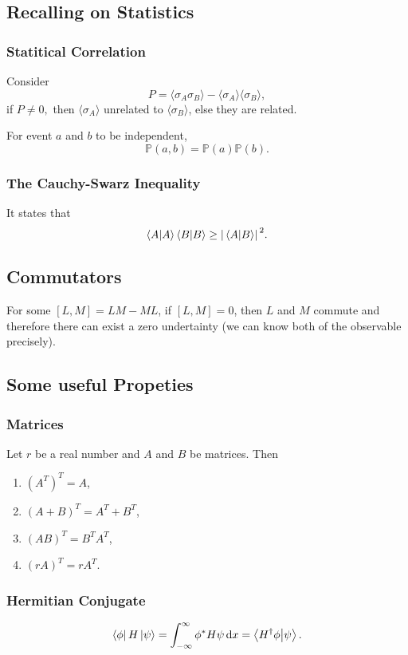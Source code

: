 \documentclass[a4paper]{article}
\begin{document}
\subsection{Recalling on Statistics}
\subsubsection{Statitical Correlation}
Consider 
\[
    P = \langle \sigma_A \sigma_B \rangle - \langle \sigma_A \rangle \langle \sigma_B \rangle,
\]
if $P \neq 0,$ then $\langle \sigma_A \rangle$ unrelated to $\langle \sigma_B \rangle$, else they are related.\\

\par For event $a$ and $b$ to be independent,
\[
    \mathbb{P}(a,b) = \mathbb{P}(a) \mathbb{P}(b).
\]  
\subsubsection{The Cauchy-Swarz Inequality}
It states that 
\[
    \braket{A}{A}\braket{B}{B} \geq \abs*{\braket*{A}{B}}^2.
\]  
\subsection{Commutators}
For some $[L,M]=LM-ML$, if $[L, M] = 0$, then $L$ and $M$ commute and therefore there can exist a zero undertainty (we can know both of the observable precisely).

\subsection{Some useful Propeties}
\subsubsection{Matrices}
\begin{flushleft}
    Let $r$ be a real number and $A$ and $B$ be matrices. Then
\end{flushleft}
\begin{enumerate}
    \item $(A^T)^T=A$,
    \item $(A+B)^T=A^T+B^T$,
    \item $(AB)^T=B^T A^T$,
    \item $(rA)^T=rA^T$.
\end{enumerate}

\subsubsection{Hermitian Conjugate}
\[
    \bra{\phi}H\ket{\psi} = \int_{-\infty}^{\infty}\phi^* H \psi \, \mathrm{d}x = \braket{H^\dagger \phi}{\psi}.
\]













\end{document}

